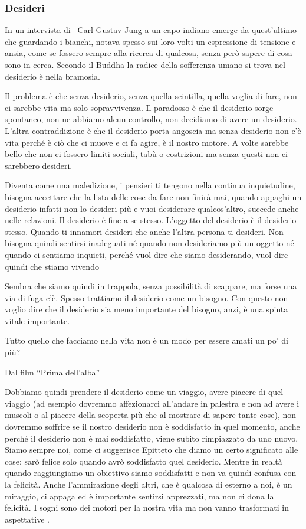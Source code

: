 \documentclass[12pt]{book} %
\begin{document}
\bigskip

\subsubsection{Desideri}
In un intervista di \ Carl Gustav Jung a un capo indiano emerge da quest'ultimo che guardando i
bianchi, notava spesso sui loro volti un espressione di tensione e ansia, come se fossero sempre alla ricerca di
qualcosa, senza però sapere di cosa sono in cerca. Secondo il Buddha la radice della sofferenza umano si trova nel
desiderio è nella bramosia.

Il problema è che senza desiderio, senza quella scintilla, quella voglia di fare, non ci sarebbe vita ma solo
sopravvivenza. Il paradosso è che il desiderio sorge spontaneo, non ne abbiamo alcun controllo, non decidiamo di avere
un desiderio. L'altra contraddizione è che il desiderio porta angoscia ma senza desiderio non c'è vita perché è ciò che
ci muove e ci fa agire, è il nostro motore. A volte sarebbe bello che non ci fossero limiti sociali, tabù o costrizioni
ma senza questi non ci sarebbero desideri.

Diventa come una maledizione, i pensieri ti tengono nella continua inquietudine, bisogna accettare che la lista delle cose da fare non finirà mai, quando appaghi un desiderio infatti non lo desideri più e vuoi desiderare qualcos'altro, succede anche nelle relazioni. Il desiderio è fine a se stesso.
L'oggetto del desiderio è il desiderio stesso. Quando ti innamori desideri che anche
l'altra persona ti desideri. Non bisogna quindi sentirsi inadeguati né quando non desideriamo più
un oggetto né quando ci sentiamo inquieti, perché vuol dire che siamo desiderando, vuol dire quindi che stiamo
vivendo

Sembra che siamo quindi in trappola, senza possibilità di scappare, ma forse una via di fuga c'è.
Spesso trattiamo il desiderio come un bisogno. Con questo non voglio dire che il desiderio sia meno importante del
bisogno, anzi, è una spinta vitale importante.

Tutto quello che facciamo nella vita non è un modo per essere amati un po' di più?

Dal film “Prima dell'alba”


\bigskip

Dobbiamo quindi prendere il desiderio come un viaggio, avere piacere di quel viaggio (ad esempio dovremmo affezionarci
all'andare in palestra e non ad avere i muscoli o al piacere della scoperta più che al mostrare di
sapere tante cose), non dovremmo soffrire se il nostro desiderio non è soddisfatto in quel momento, anche perché il
desiderio non è mai soddisfatto, viene subito rimpiazzato da uno nuovo. Siamo sempre noi, come ci suggerisce Epitteto
che diamo un certo significato alle cose: sarò felice solo quando avrò soddisfatto quel desiderio. Mentre in realtà
quando raggiungiamo un obiettivo siamo soddisfatti e non va quindi confusa con la felicità. Anche
l'ammirazione degli altri, che è qualcosa di esterno a noi, è un miraggio, ci appaga ed è
importante sentirsi apprezzati, ma non ci dona la felicità. I sogni sono dei motori per la nostra vita ma non vanno
trasformati in aspettative .
\end{document}
